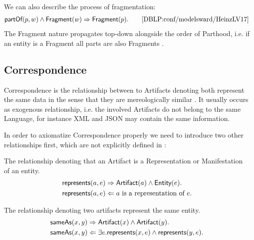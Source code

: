 We can also describe the process of fragmentation:
\begin{align*}
\textsf{partOf}(p,w) \wedge \textsf{Fragment}(w)
\Rightarrow
\textsf{Fragment}(p).
\qquad
\text{\cite{DBLP:conf/modelsward/HeinzLV17}}
\end{align*}
The \gls{Fragment} nature propagates top-down alongside the order of \gls{Parthood}, i.e. if an entity is a \gls{Fragment} all parts are also \glspl{Fragment} \cite{DBLP:conf/modelsward/HeinzLV17}.

\subsection{Correspondence}
\label{subsection:Correspondence}
\Gls{Correspondence} is the relationship between to \glspl{Artifact} denoting both represent the same data in the sense that they are mereologically similar \cite{DBLP:conf/modelsward/HeinzLV17}.
It usually occurs as exogenous relationship, i.e. the involved \glspl{Artifact} do not belong to the same \gls{Language}, for instance \gls{XML} and \gls{JSON} may contain the same information.

In order to axiomatize \gls{Correspondence} properly we need to introduce two other relationships first, which are not explicitly defined in \cite{DBLP:conf/modelsward/HeinzLV17}:
\begin{description}[align=left]
\item[\represents]
The relationship denoting that an \gls{Artifact} is a \gls{Representation} or \gls{Manifestation} of an entity.
\begin{align*}
&\textsf{represents}(a,e)
\Rightarrow
\textsf{Artifact}(a) \wedge \textsf{Entity}(e).\\
&\textsf{represents}(a,e)
\Leftarrow
a \text{ is a representation of } e.
\end{align*}

\item[\sameAs]
The relationship denoting two artifacts represent the same entity.
\begin{align*}
&\textsf{sameAs}(x,y)
\Rightarrow
\textsf{Artifact}(x) \wedge \textsf{Artifact}(y).\\
&\textsf{sameAs}(x,y)
\Leftarrow
\exists e.\textsf{represents}(x,e) \wedge \textsf{represents}(y,e).
\end{align*}
\end{description}

